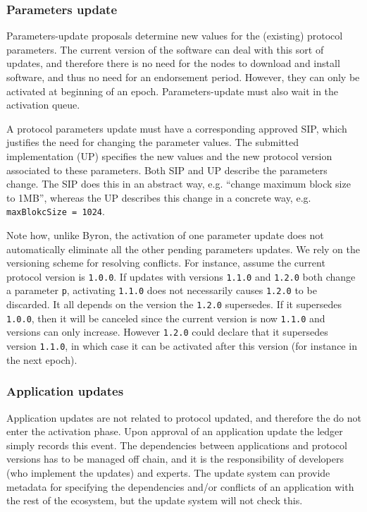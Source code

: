 \subsubsection{Parameters update}
\label{sec:parameters-update}

Parameters-update proposals determine new values for the (existing) protocol
parameters. The current version of the software can deal with this sort of
updates, and therefore there is no need for the nodes to download and install
software, and thus no need for an endorsement period. However, they can only be
activated at beginning of an epoch. Parameters-update must also wait in the
activation queue.

A protocol parameters update must have a corresponding approved SIP, which
justifies the need for changing the parameter values. The submitted
implementation (UP) specifies the new values and the new protocol version
associated to these parameters. Both SIP and UP describe the parameters change.
The SIP does this in an abstract way, e.g. ``change maximum block size to 1MB'',
whereas the UP describes this change in a concrete way, e.g.
\texttt{maxBlokcSize = 1024}.

Note how, unlike Byron, the activation of one parameter update does not
automatically eliminate all the other pending parameters updates. We rely on the
versioning scheme for resolving conflicts. For instance, assume the current
protocol version is \texttt{1.0.0}. If updates with versions \texttt{1.1.0} and
\texttt{1.2.0} both change a parameter \texttt{p}, activating \texttt{1.1.0}
does not necessarily causes \texttt{1.2.0} to be discarded. It all depends on
the version the \texttt{1.2.0} supersedes. If it supersedes \texttt{1.0.0}, then
it will be canceled since the current version is now \texttt{1.1.0} and versions
can only increase. However \texttt{1.2.0} could declare that it supersedes
version \texttt{1.1.0}, in which case it can be activated after this version
(for instance in the next epoch).

\subsubsection{Application updates}
\label{sec:software-only-updates}

Application updates are not related to protocol updated, and therefore the do
not enter the activation phase.
%
Upon approval of an application update the ledger simply records this event.
%
The dependencies between applications and protocol versions has to be managed
off chain, and it is the responsibility of developers (who implement the
updates) and experts. The update system can provide metadata for specifying the
dependencies and/or conflicts of an application with the rest of the ecosystem,
but the update system will not check this.

